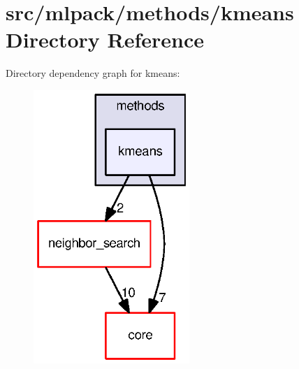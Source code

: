 \section{src/mlpack/methods/kmeans Directory Reference}
\label{dir_92fef07ccd725ea5b5efef3c585f82fc}
Directory dependency graph for kmeans\+:
\nopagebreak
\begin{figure}[H]
\begin{center}
\leavevmode
\includegraphics[width=167pt]{dir_92fef07ccd725ea5b5efef3c585f82fc_dep}
\end{center}
\end{figure}
